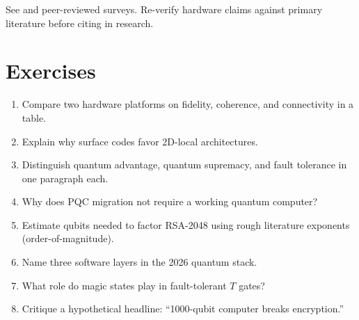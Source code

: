 See \cite{nielsen2010,preskill2018,ibm2026} and peer-reviewed surveys. Re-verify hardware claims against primary literature before citing in research.

\section*{Exercises}
\begin{enumerate}[label=\arabic*.]
\item Compare two hardware platforms on fidelity, coherence, and connectivity in a table.
\item Explain why surface codes favor 2D-local architectures.
\item Distinguish quantum advantage, quantum supremacy, and fault tolerance in one paragraph each.
\item Why does PQC migration not require a working quantum computer?
\item Estimate qubits needed to factor RSA-2048 using rough literature exponents (order-of-magnitude).
\item Name three software layers in the 2026 quantum stack.
\item What role do magic states play in fault-tolerant $T$ gates?
\item Critique a hypothetical headline: ``1000-qubit computer breaks encryption.''
\end{enumerate}
